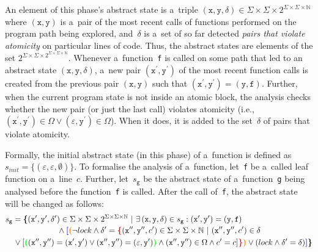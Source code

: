An element of this phase's abstract state is a~triple $ (\mathtt{x}, \mathtt{y}, \delta) \in \Sigma \times \Sigma \times 2^{\Sigma \times \Sigma \times \mathbb{N}} $ where $ (\mathtt{x}, \mathtt{y}) $ is a~pair of the most recent calls of functions performed on the program path being explored, and~$ \delta $ is a~set of so far detected \emph{pairs that violate atomicity} on particular lines of code. Thus, the abstract states are elements of the set $ 2^{\Sigma \times \Sigma \times 2^{\Sigma \times \Sigma \times \mathbb{N}}} $. Whenever a~function~\texttt{f} is called on some path that led to an abstract state $ (\mathtt{x}, \mathtt{y}, \delta) $, a~new pair $ (\mathtt{x}^\prime, \mathtt{y}^\prime) $ of the most recent function calls is created from the previous pair $ (\mathtt{x}, \mathtt{y}) $ such that $ (\mathtt{x}^\prime, \mathtt{y}^\prime) = (\mathtt{y}, \mathtt{f}) $. Further, when the current program state is not inside an atomic block, the analysis checks whether the new pair (or just the last call) violates atomicity (i.e., $ (\mathtt{x}^\prime, \mathtt{y}^\prime) \in \Omega \vee (\varepsilon, \mathtt{y}^\prime) \in \Omega $). When it does, it is added to the set~$ \delta $ of pairs that violate atomicity.

Formally, the initial abstract state (in this phase) of a~function is defined as $ s_{init} = \{(\varepsilon, \varepsilon, \emptyset)\} $. To formalise the analysis of a~function, let~\texttt{f} be a~called leaf function on a~line~$ c $. Further, let~$ s_\mathtt{g} $ be the abstract state of a~function~\texttt{g} being analysed before the function~\texttt{f} is called. After the call of~\texttt{f}, the abstract state will be changed as follows: 
$$
\begin{multlined}
    s_\mathtt{g} = \bb{\{}(\mathtt{x}^\prime, \mathtt{y}^\prime, \delta^\prime) \in \Sigma \times \Sigma \times 2^{\Sigma \times \Sigma \times \mathbb{N}}\ |\ \exists\,(\mathtt{x}, \mathtt{y}, \delta) \in s_\mathtt{g} : (\mathtt{x}^\prime, \mathtt{y}^\prime) = (\mathtt{y}, \mathtt{f}) \\
%
    \wedge \bA{[}\bB{(}\neg lock \wedge \delta^\prime = \bC{\{}(\mathtt{x}^{\prime\prime}, \mathtt{y}^{\prime\prime}, c^\prime) \in \Sigma \times \Sigma \times \mathbb{N}\ |\ (\mathtt{x}^{\prime\prime}, \mathtt{y}^{\prime\prime}, c^\prime) \in \delta \\
%
    \vee [\bD{(}(\mathtt{x}^{\prime\prime}, \mathtt{y}^{\prime\prime}) = (\mathtt{x}^{\prime}, \mathtt{y}^\prime) \vee (\mathtt{x}^{\prime\prime}, \mathtt{y}^{\prime\prime}) = (\varepsilon, \mathtt{y}^\prime)\bD{)} \wedge (\mathtt{x}^{\prime\prime}, \mathtt{y}^{\prime\prime}) \in \Omega \wedge c^\prime = c]\bC{\}}\bB{)} \vee (lock \wedge \delta^\prime = \delta)%
%
    \bA{]}\bb{\}}
\end{multlined}
$$

